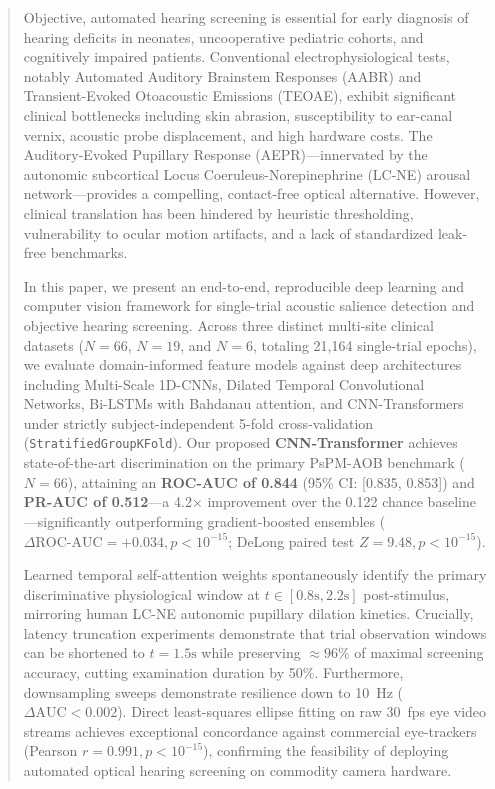 \documentclass[journal]{IEEEtran}
\begin{document}
\begin{abstract}
Objective, automated hearing screening is essential for early diagnosis of hearing deficits in neonates, uncooperative pediatric cohorts, and cognitively impaired patients. Conventional electrophysiological tests, notably Automated Auditory Brainstem Responses (AABR) and Transient-Evoked Otoacoustic Emissions (TEOAE), exhibit significant clinical bottlenecks including skin abrasion, susceptibility to ear-canal vernix, acoustic probe displacement, and high hardware costs. The Auditory-Evoked Pupillary Response (AEPR)—innervated by the autonomic subcortical Locus Coeruleus-Norepinephrine (LC-NE) arousal network—provides a compelling, contact-free optical alternative. However, clinical translation has been hindered by heuristic thresholding, vulnerability to ocular motion artifacts, and a lack of standardized leak-free benchmarks.

In this paper, we present an end-to-end, reproducible deep learning and computer vision framework for single-trial acoustic salience detection and objective hearing screening. Across three distinct multi-site clinical datasets ($N=66$, $N=19$, and $N=6$, totaling 21,164 single-trial epochs), we evaluate domain-informed feature models against deep architectures including Multi-Scale 1D-CNNs, Dilated Temporal Convolutional Networks, Bi-LSTMs with Bahdanau attention, and CNN-Transformers under strictly subject-independent 5-fold cross-validation (\texttt{StratifiedGroupKFold}). Our proposed \textbf{CNN-Transformer} achieves state-of-the-art discrimination on the primary PsPM-AOB benchmark ($N=66$), attaining an \textbf{ROC-AUC of 0.844} (95\% CI: [0.835, 0.853]) and \textbf{PR-AUC of 0.512}—a 4.2$\times$ improvement over the 0.122 chance baseline—significantly outperforming gradient-boosted ensembles ($\Delta\text{ROC-AUC} = +0.034, p < 10^{-15}$; DeLong paired test $Z = 9.48, p < 10^{-15}$).

Learned temporal self-attention weights spontaneously identify the primary discriminative physiological window at $t \in [0.8\text{s}, 2.2\text{s}]$ post-stimulus, mirroring human LC-NE autonomic pupillary dilation kinetics. Crucially, latency truncation experiments demonstrate that trial observation windows can be shortened to $t = 1.5\text{s}$ while preserving ${\approx}96\%$ of maximal screening accuracy, cutting examination duration by 50\%. Furthermore, downsampling sweeps demonstrate resilience down to 10~Hz ($\Delta\text{AUC} < 0.002$). Direct least-squares ellipse fitting on raw 30~fps eye video streams achieves exceptional concordance against commercial eye-trackers (Pearson $r = 0.991, p < 10^{-15}$), confirming the feasibility of deploying automated optical hearing screening on commodity camera hardware.
\end{abstract}
\end{document}
